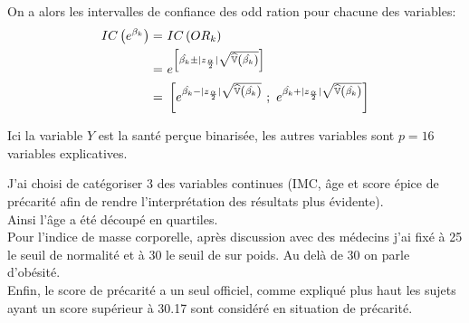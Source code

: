 \documentclass{book}
\begin{document}
\bigskip

\noindent
On a alors les intervalles de confiance des odd ration pour chacune des variables:\\
\begin{align*}
IC \left( e^{\beta_k} \right)  =& ~ IC \left( OR_k \right) \\
= & ~ e^{\left[ \hat{\beta_k} \pm |z_{{\alpha} \over {2}}| \sqrt{\widehat{\mathbb{V}}\left( \hat{\beta_k} \right)} \right]} \\
= & ~
 \left[
e^{\hat{\beta_k} - |z_{{\alpha} \over {2}}| \sqrt{\widehat{\mathbb{V}}\left( \hat{\beta_k} \right)}} 
~;~ 
e^{\hat{\beta_k} + |z_{{\alpha} \over {2}}| \sqrt{\widehat{\mathbb{V}}\left( \hat{\beta_k} \right)}} 
\right]
\end{align*}

\bigskip
\noindent
Ici la variable $Y$ est la santé perçue binarisée, les autres variables sont $p = 16 $ variables explicatives.

\bigskip

\noindent
J'ai choisi de catégoriser 3 des variables continues (IMC, âge et score épice de précarité afin de rendre l'interprétation des résultats plus évidente).\\
Ainsi l'âge a été découpé en quartiles.\\
Pour l'indice de masse corporelle, après discussion avec des médecins j'ai fixé à 25 le seuil de normalité et à 30 le seuil de sur poids. Au delà de 30 on parle d'obésité.\\
Enfin, le score de précarité a un seul officiel, comme expliqué plus haut les sujets ayant un score supérieur à 30.17 sont considéré en situation de précarité.\\


\newpage
\end{document}
